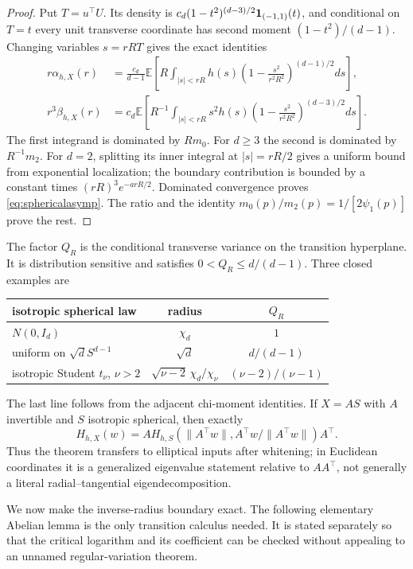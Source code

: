 \documentclass[11pt]{article}
\newcommand{\E}{\mathbb E}
\begin{document}
\begin{proof}
Put $T=u^\top U$.  Its density is
$c_d(1-t^2)^{(d-3)/2}{\bf1}_{(-1,1)}(t)$, and conditional on $T=t$ every unit transverse coordinate has second
moment $(1-t^2)/(d-1)$.  Changing variables $s=rRT$ gives the exact identities
\begin{align}
 r\alpha_{h,X}(r)
 &=\frac{c_d}{d-1}\E\!\left[R\!\int_{|s|<rR}\!h(s)
 \left(1-\frac{s^2}{r^2R^2}\right)^{(d-1)/2}ds\right],\label{eq:sphericalexacta}\\
 r^3\beta_{h,X}(r)
 &=c_d\E\!\left[R^{-1}\!\int_{|s|<rR}\!s^2h(s)
 \left(1-\frac{s^2}{r^2R^2}\right)^{(d-3)/2}ds\right].\label{eq:sphericalexactb}
\end{align}
The first integrand is dominated by $Rm_0$.  For $d\ge3$ the second is dominated by $R^{-1}m_2$.
For $d=2$, splitting its inner integral at $|s|=rR/2$ gives a uniform bound from exponential localization;
the boundary contribution is bounded by a constant times $(rR)^3e^{-arR/2}$.  Dominated convergence proves
\eqref{eq:sphericalasymp}.  The ratio and the identity $m_0(p)/m_2(p)=1/[2\psi_1(p)]$ prove the rest.
\end{proof}

The factor $Q_R$ is the conditional transverse variance on the transition hyperplane.  It is distribution
sensitive and satisfies $0<Q_R\le d/(d-1)$.  Three closed examples are
\begin{center}
\begin{tabular}{lcc}
\toprule
isotropic spherical law & radius & $Q_R$\\
\midrule
$N(0,I_d)$ & $\chi_d$ & $1$\\
uniform on $\sqrt dS^{d-1}$ & $\sqrt d$ & $d/(d-1)$\\
isotropic Student $t_\nu$, $\nu>2$ & $\sqrt{\nu-2}\,\chi_d/\chi_\nu$ & $(\nu-2)/(\nu-1)$\\
\bottomrule
\end{tabular}
\end{center}
The last line follows from the adjacent chi-moment identities.  If $X=AS$ with $A$ invertible and $S$ isotropic
spherical, then exactly
\[
 H_{h,X}(w)=A H_{h,S}(\lVert A^\top w\rVert,A^\top w/\lVert A^\top w\rVert)A^\top.
\]
Thus the theorem transfers to elliptical inputs after whitening; in Euclidean coordinates it is a generalized
eigenvalue statement relative to $AA^\top$, not generally a literal radial--tangential eigendecomposition.

We now make the inverse-radius boundary exact.  The following elementary Abelian lemma is the only transition
calculus needed.  It is stated separately so that the critical logarithm and its coefficient can be checked without
appealing to an unnamed regular-variation theorem.
\end{document}
